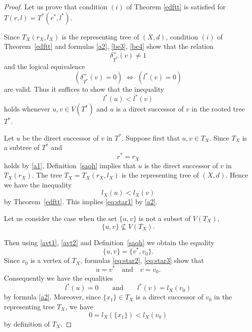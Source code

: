 \documentclass[10pt,a4paper]{amsart}
\begin{document}
\begin{proof}
Let us prove that condition $(i)$ of Theorem \ref{edftt} is satisfied for $T(r,l)=T^*(r^*,l^*)$.




Since \(T_X(r_X,l_X)\) is the representing tree of \((X,d)\), condition $(i)$ of Theorem~\ref{edftt} and formulas \eqref{a2}, \eqref{be3},  \eqref{be4} show that the relation
\begin{equation}
    \label{be5}
\delta^{+}_{T^*}(v) \neq 1 
\end{equation}
and the logical equivalence
\begin{equation}
    \label{be6}
(\delta^{+}_{T^*}(v)=0)\;\Longleftrightarrow\; (l^{*}(v)=0) 
\end{equation}
are valid.
Thus it suffices to show that the inequality
\begin{equation}\label{eq:star1}
l^{*}(u)<l^{*}(v)
\end{equation}
holds whenever \(u,v\in V(T^{*})\) and \(u\) is a direct successor of \(v\) in the rooted tree \(T^{*}\).

Let \(u\) be the direct successor of \(v\) in \(T^{*}\). Suppose first that \(u,v\in T_X\).
Since \(T_X\) is a subtree of \(T^{*}\) and \[r^{*}=r_X\] holds by \eqref{a1}, Definition~\ref{saqh} implies that \(u\) is the direct successor of \(v\) in \(T_X(r_X)\).
The tree \(T_X=T_X(r_X,l_X)\) is the representing tree of \((X,d)\).
Hence we have the inequality
\[
l_X(u)<l_X(v)
\]
by Theorem~\ref{edftt}. 
This implies \eqref{eq:star1} by \eqref{a2}.


Let us consider the case when the set \(\{u,v\}\) is not a subset of \(V(T_X)\),
\begin{equation}\label{eq:star2}
\{u,v\}\not\subseteq V(T_X).
\end{equation}

Then using \eqref{avt1}, \eqref{avt2} and Definition~\ref{saqh} we obtain the equality
\begin{equation}\label{eq:star3}
\{u,v\}=\{v^{*},v_0\}.
\end{equation}
Since \(v_0\) is a vertex of \(T_X\), formulas \eqref{eq:star2}, \eqref{eq:star3} show that
\begin{equation}\label{eq:star4}
u=v^{*}\quad\text{and}\quad v=v_0.
\end{equation}
Consequently we have the equalities
\begin{equation}\label{eq:star5}
l^{*}(u)=0
\qquad\text{and}\qquad
l^{*}(v)=l_X(v_0)
\end{equation}
by formula \eqref{a2}.
Moreover, since \(\{x_1\}\in T_X\) is a direct successor of \(v_0\) in the representing tree \(T_X\), we have
\begin{equation}\label{eq:star6}
0= l_X(\{x_1\})<l_X(v_0)
\end{equation}
by definition of $T_X$.


\end{proof}
\end{document}
